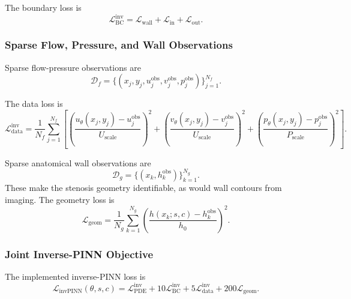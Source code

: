 \documentclass[11pt]{article}
\begin{document}
The boundary loss is
\begin{equation}
    \mathcal{L}_{\mathrm{BC}}^{\mathrm{inv}}
    =
    \mathcal{L}_{\mathrm{wall}}
    +
    \mathcal{L}_{\mathrm{in}}
    +
    \mathcal{L}_{\mathrm{out}}.
\end{equation}

\subsubsection{Sparse Flow, Pressure, and Wall Observations}

Sparse flow-pressure observations are
\begin{equation}
    \mathcal{D}_f
    =
    \{
    (x_j,y_j,u_j^{\mathrm{obs}},v_j^{\mathrm{obs}},p_j^{\mathrm{obs}})
    \}_{j=1}^{N_f}.
\end{equation}

The data loss is
\begin{equation}
    \mathcal{L}_{\mathrm{data}}^{\mathrm{inv}}
    =
    \frac{1}{N_f}
    \sum_{j=1}^{N_f}
    \left[
        \left(
            \frac{u_{\theta}(x_j,y_j)-u_j^{\mathrm{obs}}}
            {U_{\mathrm{scale}}}
        \right)^2
        +
        \left(
            \frac{v_{\theta}(x_j,y_j)-v_j^{\mathrm{obs}}}
            {U_{\mathrm{scale}}}
        \right)^2
        +
        \left(
            \frac{p_{\theta}(x_j,y_j)-p_j^{\mathrm{obs}}}
            {P_{\mathrm{scale}}}
        \right)^2
    \right].
\end{equation}

Sparse anatomical wall observations are
\begin{equation}
    \mathcal{D}_g
    =
    \{(x_k,h_k^{\mathrm{obs}})\}_{k=1}^{N_g}.
\end{equation}
These make the stenosis geometry identifiable, as would wall contours from imaging. The geometry loss is
\begin{equation}
    \mathcal{L}_{\mathrm{geom}}
    =
    \frac{1}{N_g}
    \sum_{k=1}^{N_g}
    \left(
        \frac{h(x_k;s,c)-h_k^{\mathrm{obs}}}{h_0}
    \right)^2.
\end{equation}

\subsubsection{Joint Inverse-PINN Objective}

The implemented inverse-PINN loss is
\begin{equation}
    \mathcal{L}_{\mathrm{invPINN}}(\theta,s,c)
    =
    \mathcal{L}_{\mathrm{PDE}}^{\mathrm{inv}}
    +
    10\mathcal{L}_{\mathrm{BC}}^{\mathrm{inv}}
    +
    5\mathcal{L}_{\mathrm{data}}^{\mathrm{inv}}
    +
    200\mathcal{L}_{\mathrm{geom}}.
\end{equation}
\end{document}
